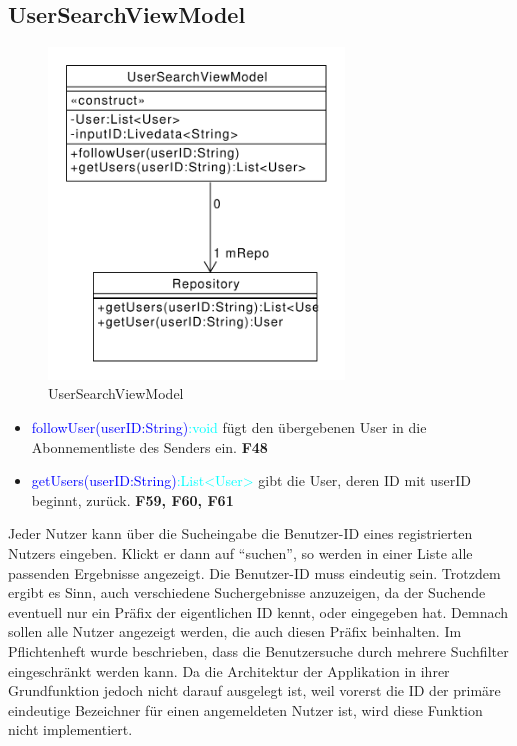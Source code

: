 \subsection{UserSearchViewModel}
\begin{figure}[H]
	\centering
	\includegraphics[width=0.7\textwidth]{pics/viewModel/User_Search_ViewModel.pdf}%
	\caption{UserSearchViewModel}%
	\label{viewModel}%
\end{figure}
\begin{itemize}
	\item \textcolor{blue}{followUser(userID:String)}\textcolor{cyan}{:void}  fügt den übergebenen User in die Abonnementliste des Senders ein. \textbf{F48}
	
	\item \textcolor{blue}{getUsers(userID:String)}\textcolor{cyan}{:List<User>} gibt die User, deren ID mit userID beginnt, zurück. \textbf{F59, F60, F61}
\end{itemize}
Jeder Nutzer kann über die Sucheingabe die Benutzer-ID eines registrierten Nutzers eingeben. Klickt er dann auf "`suchen"', so werden in einer Liste alle passenden Ergebnisse angezeigt. Die Benutzer-ID muss eindeutig sein. Trotzdem ergibt es Sinn, auch verschiedene Suchergebnisse anzuzeigen, da der Suchende eventuell nur ein Präfix der eigentlichen ID kennt, oder eingegeben hat. Demnach sollen alle Nutzer angezeigt werden, die auch diesen Präfix beinhalten. 
Im Pflichtenheft wurde beschrieben, dass die Benutzersuche durch mehrere Suchfilter eingeschränkt werden kann. Da die Architektur der Applikation in ihrer Grundfunktion jedoch nicht darauf ausgelegt ist, weil vorerst die ID der primäre eindeutige Bezeichner für einen angemeldeten Nutzer ist, wird diese Funktion nicht implementiert.

